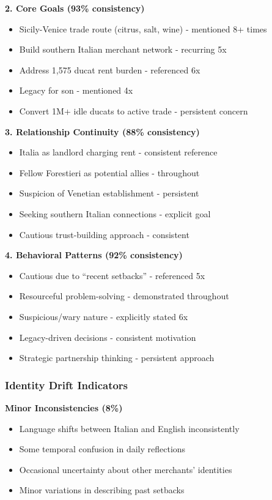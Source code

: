 \documentclass[11pt,a4paper]{article}
\begin{document}
\textbf{2. Core Goals (93\% consistency)}
\begin{itemize}
\item Sicily-Venice trade route (citrus, salt, wine) - mentioned 8+ times
\item Build southern Italian merchant network - recurring 5x
\item Address 1,575 ducat rent burden - referenced 6x
\item Legacy for son - mentioned 4x
\item Convert 1M+ idle ducats to active trade - persistent concern
\end{itemize}

\textbf{3. Relationship Continuity (88\% consistency)}
\begin{itemize}
\item Italia as landlord charging rent - consistent reference
\item Fellow Forestieri as potential allies - throughout
\item Suspicion of Venetian establishment - persistent
\item Seeking southern Italian connections - explicit goal
\item Cautious trust-building approach - consistent
\end{itemize}

\textbf{4. Behavioral Patterns (92\% consistency)}
\begin{itemize}
\item Cautious due to ``recent setbacks'' - referenced 5x
\item Resourceful problem-solving - demonstrated throughout
\item Suspicious/wary nature - explicitly stated 6x
\item Legacy-driven decisions - consistent motivation
\item Strategic partnership thinking - persistent approach
\end{itemize}

\subsubsection{Identity Drift Indicators}

\textbf{Minor Inconsistencies (8\%)}
\begin{itemize}
\item Language shifts between Italian and English inconsistently
\item Some temporal confusion in daily reflections
\item Occasional uncertainty about other merchants' identities
\item Minor variations in describing past setbacks
\end{itemize}
\end{document}
